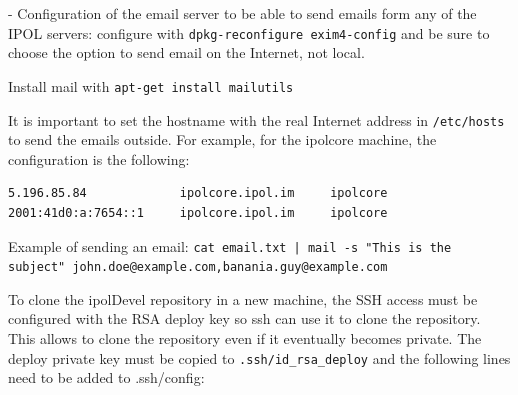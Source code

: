 \documentclass[a4paper,12pt]{article}
\begin{document}
- Configuration of the email server to be able to send emails form any of the IPOL servers: configure with {\tt dpkg-reconfigure exim4-config} and be sure to choose the option to send email on the Internet, not local.

Install mail with {\tt apt-get install mailutils}

It is important to set the hostname with the real Internet address in {\tt /etc/hosts} to send the emails outside. For example, for the ipolcore machine, the configuration is the following:

\begin{verbatim}
5.196.85.84             ipolcore.ipol.im     ipolcore
2001:41d0:a:7654::1     ipolcore.ipol.im     ipolcore
\end{verbatim}

Example of sending an email: {\tt cat email.txt | mail -s "This is the subject" john.doe@example.com,banania.guy@example.com}

To clone the ipolDevel repository in a new machine, the SSH access must be configured with the RSA deploy key so ssh can use it to clone the repository. This allows to clone the repository even if it eventually becomes private.
%
The deploy private key must be copied to {\tt .ssh/id\_rsa\_deploy} and the following lines need to be added to .ssh/config:
\end{document}
